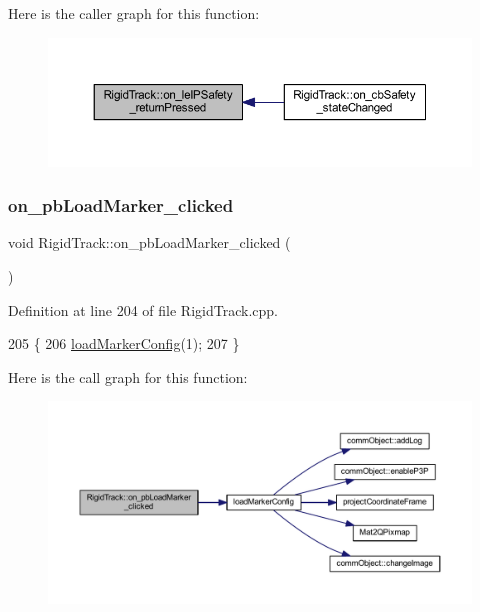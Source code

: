 Here is the caller graph for this function\+:\nopagebreak
\begin{figure}[H]
\begin{center}
\leavevmode
\includegraphics[width=350pt]{class_rigid_track_aa527ab3a2ddc7b31bf1063260efc9755_icgraph}
\end{center}
\end{figure}
\mbox{\label{class_rigid_track_ad3e07592fbc1491cdc36dd5e817e1775}} 
\subsubsection{\texorpdfstring{on\+\_\+pb\+Load\+Marker\+\_\+clicked}{on\_pbLoadMarker\_clicked}}
{\footnotesize\ttfamily void Rigid\+Track\+::on\+\_\+pb\+Load\+Marker\+\_\+clicked (\begin{DoxyParamCaption}{ }\end{DoxyParamCaption})\hspace{0.3cm}{\ttfamily [slot]}}



Definition at line 204 of file Rigid\+Track.\+cpp.


\begin{DoxyCode}
205 \{
206     \hyperlink{main_8cpp_a56c7f641859cb2b6b99b0947d03be800}{loadMarkerConfig}(1);
207 \}
\end{DoxyCode}
Here is the call graph for this function\+:\nopagebreak
\begin{figure}[H]
\begin{center}
\leavevmode
\includegraphics[width=350pt]{class_rigid_track_ad3e07592fbc1491cdc36dd5e817e1775_cgraph}
\end{center}
\end{figure}
\mbox{\label{class_rigid_track_a19bc46333f946e589184eeed998160da}} 
